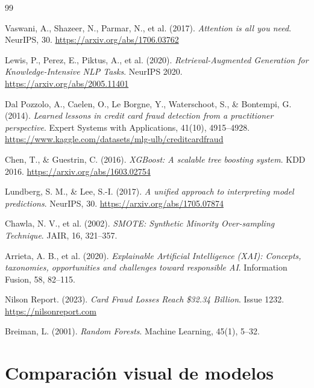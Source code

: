 \documentclass[10pt,twocolumn]{article}
\begin{document}
\begin{thebibliography}{99}

Vaswani, A., Shazeer, N., Parmar, N., et al. (2017).
\textit{Attention is all you need}.
NeurIPS, 30.
\url{https://arxiv.org/abs/1706.03762}

Lewis, P., Perez, E., Piktus, A., et al. (2020).
\textit{Retrieval-Augmented Generation for Knowledge-Intensive NLP Tasks}.
NeurIPS 2020.
\url{https://arxiv.org/abs/2005.11401}

Dal Pozzolo, A., Caelen, O., Le Borgne, Y., Waterschoot, S., \& Bontempi, G. (2014).
\textit{Learned lessons in credit card fraud detection from a practitioner perspective}.
Expert Systems with Applications, 41(10), 4915--4928.
\url{https://www.kaggle.com/datasets/mlg-ulb/creditcardfraud}

Chen, T., \& Guestrin, C. (2016).
\textit{XGBoost: A scalable tree boosting system}.
KDD 2016. \url{https://arxiv.org/abs/1603.02754}

Lundberg, S. M., \& Lee, S.-I. (2017).
\textit{A unified approach to interpreting model predictions}.
NeurIPS, 30. \url{https://arxiv.org/abs/1705.07874}

Chawla, N. V., et al. (2002).
\textit{SMOTE: Synthetic Minority Over-sampling Technique}.
JAIR, 16, 321--357.

Arrieta, A. B., et al. (2020).
\textit{Explainable Artificial Intelligence (XAI): Concepts, taxonomies,
opportunities and challenges toward responsible AI}.
Information Fusion, 58, 82--115.

Nilson Report. (2023).
\textit{Card Fraud Losses Reach \$32.34 Billion}.
Issue 1232. \url{https://nilsonreport.com}

Breiman, L. (2001).
\textit{Random Forests}.
Machine Learning, 45(1), 5--32.

\end{thebibliography}

\appendix

\section{Comparación visual de modelos}
\end{document}
